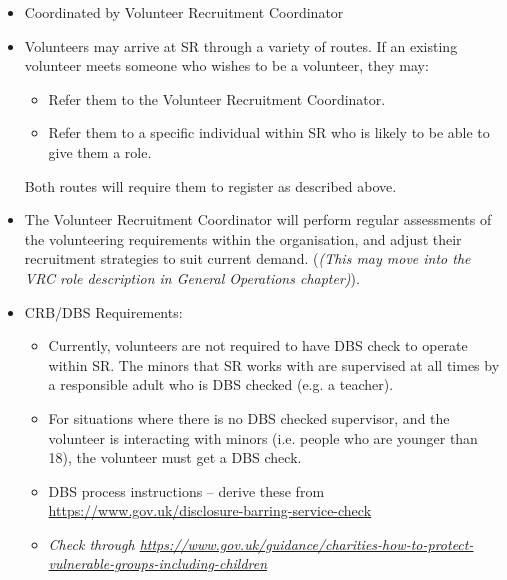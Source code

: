 \begin{itemize}
\item Coordinated by Volunteer Recruitment Coordinator
\item Volunteers may arrive at SR through a variety of routes.  If an existing volunteer meets someone who wishes to be a volunteer, they may:
  \begin{itemize}
  \item Refer them to the Volunteer Recruitment Coordinator.
  \item Refer them to a specific individual within SR who is likely to be able to give them a role.
  \end{itemize}
Both routes will require them to register as described above.
  
\item The Volunteer Recruitment Coordinator will perform regular assessments of the volunteering requirements within the organisation, and adjust their recruitment strategies to suit current demand. (\textit{(This may move into the VRC role description in General Operations chapter)}).

\item CRB/DBS Requirements:
  \begin{itemize}
  \item Currently, volunteers are not required to have  DBS check to operate within SR.  The minors that SR works with are supervised at all times by a responsible adult who is DBS checked (e.g. a teacher).
  \item For situations where there is no DBS checked supervisor, and the volunteer is interacting with minors (i.e. people who are younger than 18), the volunteer must get a DBS check.
  \item DBS process instructions -- derive these from \url{https://www.gov.uk/disclosure-barring-service-check}
  \item \textit{Check through \url{https://www.gov.uk/guidance/charities-how-to-protect-vulnerable-groups-including-children}}
  \end{itemize}
\end{itemize}
